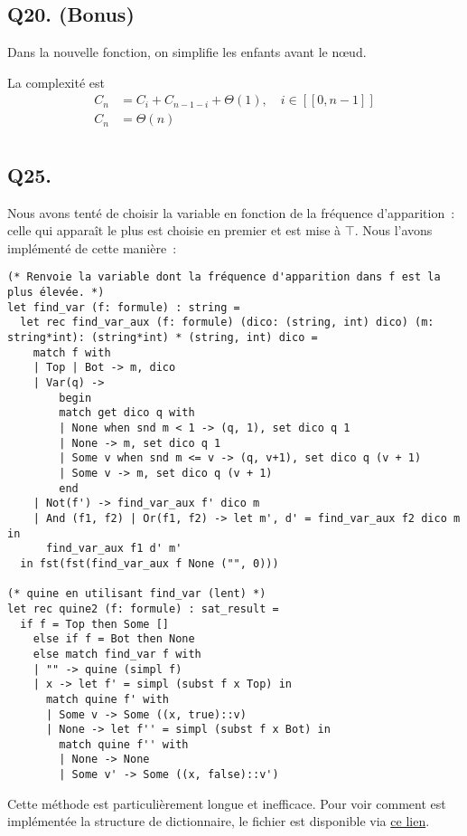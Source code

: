\subsection*{Q20. (Bonus)}
Dans la nouvelle fonction, on simplifie les enfants avant le nœud.

La complexité est
\begin{align*}
    C_n &= C_{i} + C_{n-1-i} + \Theta(1), \quad i \in [\![0,n-1]\!]\\
    C_n &= \boxed{\Theta(n)}\\
\end{align*}

\subsection*{Q25.}

Nous avons tenté de choisir la variable en fonction de la fréquence
d’apparition~: celle qui apparaît le plus est choisie en premier et est mise
à $\top$. Nous l’avons implémenté de cette manière~:

\begin{lstlisting}[language=caml]
(* Renvoie la variable dont la fréquence d'apparition dans f est la plus élevée. *)
let find_var (f: formule) : string =
  let rec find_var_aux (f: formule) (dico: (string, int) dico) (m: string*int): (string*int) * (string, int) dico =
    match f with
    | Top | Bot -> m, dico
    | Var(q) ->
        begin
        match get dico q with
        | None when snd m < 1 -> (q, 1), set dico q 1
        | None -> m, set dico q 1
        | Some v when snd m <= v -> (q, v+1), set dico q (v + 1)
        | Some v -> m, set dico q (v + 1)
        end
    | Not(f') -> find_var_aux f' dico m
    | And (f1, f2) | Or(f1, f2) -> let m', d' = find_var_aux f2 dico m in
      find_var_aux f1 d' m'
  in fst(fst(find_var_aux f None ("", 0)))

(* quine en utilisant find_var (lent) *)
let rec quine2 (f: formule) : sat_result =
  if f = Top then Some []
    else if f = Bot then None
    else match find_var f with
    | "" -> quine (simpl f)
    | x -> let f' = simpl (subst f x Top) in
      match quine f' with
      | Some v -> Some ((x, true)::v)
      | None -> let f'' = simpl (subst f x Bot) in
        match quine f'' with
        | None -> None
        | Some v' -> Some ((x, false)::v')
\end{lstlisting}

Cette méthode est particulièrement longue et inefficace. Pour voir comment est
implémentée la structure de dictionnaire, le fichier est disponible via
\href{https://github.com/jd-develop/SNT-NSI/blob/0dac83109e924ea315277291cb7cc9fd998daa48/MP2I/DMs/DM3/satsolver/dico.ml}{ce lien}.

